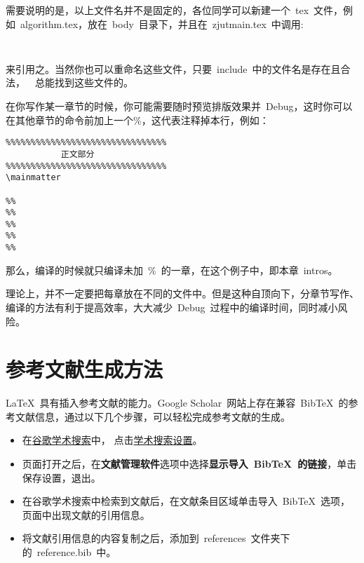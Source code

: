 需要说明的是，以上文件名并不是固定的，各位同学可以新建一个~tex~文件，例如~algorithm.tex，放在~body~目录下，并且在~zjutmain.tex~中调用:
\begin{verbatim}
    
\end{verbatim}
来引用之。当然你也可以重命名这些文件，只要~include~中的文件名是存在且合法，~\XeLaTeX~总能找到这些文件的。

在你写作某一章节的时候，你可能需要随时预览排版效果并~Debug，这时你可以在其他章节的\verb||命令前加上一个\%，这代表注释掉本行，例如：
\begin{verbatim}
%%%%%%%%%%%%%%%%%%%%%%%%%%%%%%%%
           正文部分
%%%%%%%%%%%%%%%%%%%%%%%%%%%%%%%%
\mainmatter

%%
%%
%%
%%
%%
\end{verbatim}
那么，编译的时候就只编译未加~\%~的一章，在这个例子中，即本章~intros。

理论上，并不一定要把每章放在不同的文件中。但是这种自顶向下，分章节写作、编译的方法有利于提高效率，大大减少~Debug~过程中的编译时间，同时减小风险。

\section{参考文献生成方法}

\LaTeX~具有插入参考文献的能力。Google Scholar~网站上存在兼容~BibTeX~的参考文献信息，通过以下几个步骤，可以轻松完成参考文献的生成。
\begin{itemize}
  \item 在\href{http://scholar.google.com/}{谷歌学术搜索}中，
        点击\href{http://scholar.google.com/scholar_preferences?hl=en&as_sdt=0,5}{学术搜索设置}。
  \item 页面打开之后，在\textbf{文献管理软件}选项中选择\textbf{显示导入~BibTeX~的链接}，单击保存设置，退出。
  \item 在谷歌学术搜索中检索到文献后，在文献条目区域单击导入~BibTeX~选项，页面中出现文献的引用信息。
  \item 将文献引用信息的内容复制之后，添加到~references~文件夹下的~reference.bib~中。
\end{itemize}

